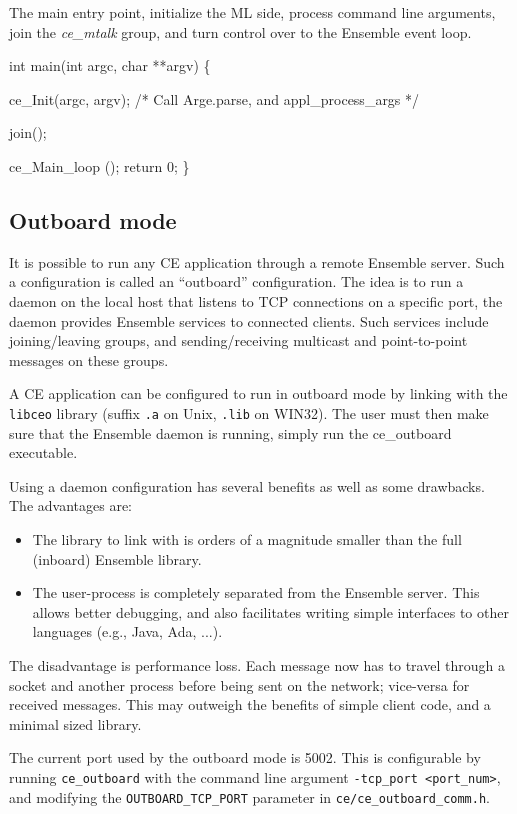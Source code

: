 The main entry point, initialize the ML side, process command line 
arguments, join the {\it ce\_mtalk} group, and turn control over
to the Ensemble event loop.
\begin{codebox}
int main(int argc, char **argv) \{
  
  ce_Init(argc, argv); /* Call Arge.parse, and appl_process_args */

  join();
  
  ce_Main_loop ();
  return 0;
\}
\end{codebox}

\subsection{Outboard mode}
It is possible to run any CE application through a remote Ensemble
server. Such a configuration is called an ``outboard'' configuration.
The idea is to run a daemon on the local host that listens to
TCP connections on a specific port, the daemon provides Ensemble
services to connected clients. Such services include joining/leaving groups, 
and sending/receiving multicast and point-to-point
messages on these groups. 

A CE application can be configured to run in outboard mode by linking
with the {\tt libceo} library (suffix {\tt .a} on Unix,  {\tt .lib}
on WIN32). The user must then make sure that the Ensemble daemon is
running, simply run the ce\_outboard executable.

Using a daemon configuration has several benefits as well as some
drawbacks. The advantages are:
\begin{itemize}
\item The library to link with is orders
  of a magnitude smaller than the full (inboard) Ensemble library.
\item The user-process is completely separated from the Ensemble
  server. This allows better debugging, and also facilitates writing simple
  interfaces to other languages (e.g., Java, Ada, ...). 
\end{itemize}

The disadvantage is performance loss. Each message now has to travel
through a socket and another process before being sent on the network;
vice-versa for received messages. This may outweigh the benefits of
simple client code, and a minimal sized library.

The current port used by the outboard mode is 5002. This is
configurable by running {\tt ce\_outboard} with the command line
argument {\tt -tcp\_port <port\_num>}, and modifying the 
{\tt OUTBOARD\_TCP\_PORT} parameter in {\tt ce/ce\_outboard\_comm.h}.

